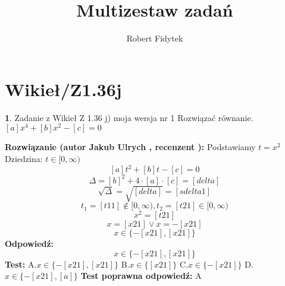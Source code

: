 \documentclass[12pt, a4paper]{article}
\title{Multizestaw zadań}
\author{Robert Fidytek}
\date{}
\theoremstyle{definition} %
\newtheorem{zad}{}
\newcommand{\kategoria}[1]{\section{#1}} %
\newcommand{\zadStart}[1]{\begin{zad}#1\newline} %
\newcommand{\zadStop}{\end{zad}}   %
\newcommand{\rozwStart}[2]{\noindent \textbf{Rozwiązanie (autor #1 , recenzent #2): }\newline} %
\newcommand{\rozwStop}{\newline}                                            %
\newcommand{\odpStart}{\noindent \textbf{Odpowiedź:}\newline}    %
\newcommand{\odpStop}{\newline}                                             %
\newcommand{\testStart}{\noindent \textbf{Test:}\newline} %
\newcommand{\testStop}{\newline} %
\newcommand{\kluczStart}{\noindent \textbf{Test poprawna odpowiedź:}\newline} %
\newcommand{\kluczStop}{\newline} %
\begin{document}
\maketitle


\kategoria{Wikieł/Z1.36j}
\zadStart{Zadanie z Wikieł Z 1.36 j) moja wersja nr 1}
Rozwiązać równanie. $[a]x^{4}+[b]x^{2}-[c]=0$
\zadStop
\rozwStart{Jakub Ulrych}{}
Podstawiamy $t=x^{2}$\\ Dziedzina: $t\in[0,\infty)$
$$[a]t^{2}+[b]t-[c]=0$$
$$\Delta=[b]^{2}+4\cdot[a]\cdot[c]=[delta]$$
$$\sqrt{\Delta}=\sqrt{[delta]}=[sdelta1]$$
$$t_{1}=[t11]\notin[0,\infty),t_{2}=[t21]\in[0,\infty)$$
$$x^{2}=[t21]$$
$$x=[x21]\vee x=-[x21]$$
$$x\in\{-[x21],[x21]\}$$
\rozwStop
\odpStart
$$x\in\{-[x21],[x21]\}$$
\odpStop
\testStart
A.$x\in\{-[x21],[x21]\}$
B.$x\in\{[x21]\}$
C.$x\in\{-[x21]\}$
D.$x\in\{-[x21],[a]\}$
\testStop
\kluczStart
A
\kluczStop
\end{document}
